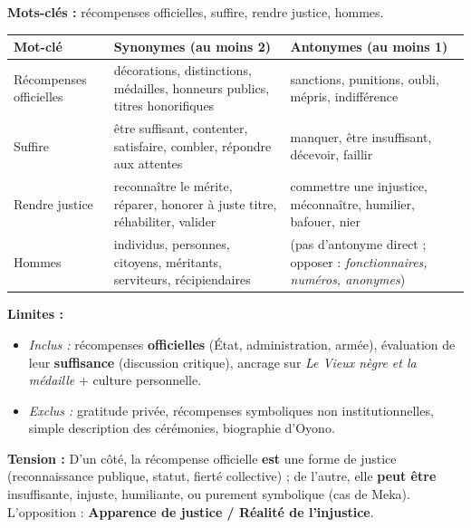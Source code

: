 \documentclass[11pt]{article}
\newcommand{\cle}[1]{{\popxbold\color{popdark}#1}}
\begin{document}
\begin{exemplebox}
\textbf{Mots-clés :} \cle{récompenses officielles}, \cle{suffire}, \cle{rendre justice}, \cle{hommes}.

\begin{center}
\begin{tabularx}{\linewidth}{|l|X|X|}\hline
\rowcolor{popblueL} Mot-clé & Synonymes (au moins 2) & Antonymes (au moins 1) \\ \hline
Récompenses officielles & décorations, distinctions, médailles, honneurs publics, titres honorifiques & sanctions, punitions, oubli, mépris, indifférence \\ \hline
Suffire & être suffisant, contenter, satisfaire, combler, répondre aux attentes & manquer, être insuffisant, décevoir, faillir \\ \hline
Rendre justice & reconnaître le mérite, réparer, honorer à juste titre, réhabiliter, valider & commettre une injustice, méconnaître, humilier, bafouer, nier \\ \hline
Hommes & individus, personnes, citoyens, méritants, serviteurs, récipiendaires & (pas d'antonyme direct ; opposer : \emph{fonctionnaires, numéros, anonymes}) \\ \hline
\end{tabularx}
\end{center}

\textbf{Limites :}
\begin{itemize}
\item \emph{Inclus :} récompenses \textbf{officielles} (État, administration, armée), évaluation de leur \textbf{suffisance} (discussion critique), ancrage sur \emph{Le Vieux nègre et la médaille} + culture personnelle.
\item \emph{Exclus :} gratitude privée, récompenses symboliques non institutionnelles, simple description des cérémonies, biographie d'Oyono.
\end{itemize}

\textbf{Tension :} D'un côté, la récompense officielle \textbf{est} une forme de justice (reconnaissance publique, statut, fierté collective) ; de l'autre, elle \textbf{peut être} insuffisante, injuste, humiliante, ou purement symbolique (cas de Meka). L'opposition : \textbf{Apparence de justice / Réalité de l'injustice}.


\end{exemplebox}
\end{document}
